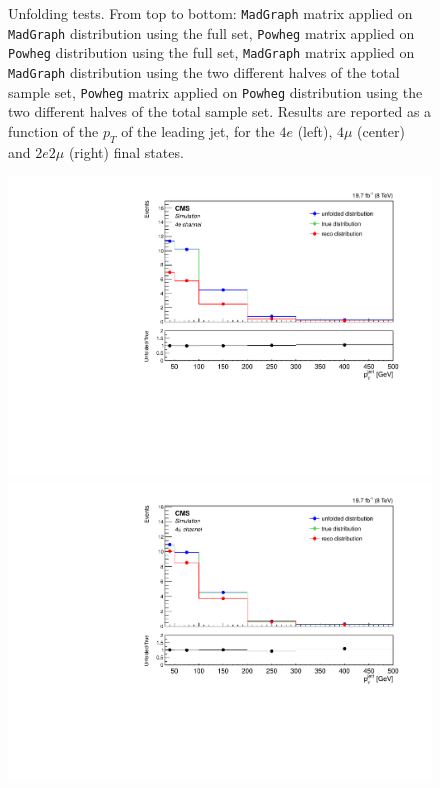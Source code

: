 \begin{figure}[hbtp]
\begin{center}
      \caption{Unfolding tests. From top to bottom: \texttt{MadGraph} matrix applied on \texttt{MadGraph} distribution using the full set, \texttt{Powheg} matrix applied on \texttt{Powheg} distribution using the full set,  \texttt{MadGraph} matrix applied on \texttt{MadGraph} distribution using the two different halves of the total sample set, \texttt{Powheg} matrix applied on \texttt{Powheg} distribution using the two different halves of the total sample set. Results are reported as a function of the $p_T$ of the leading jet, for the $4e$ (left), $4\mu$ (center) and $2e2\mu$ (right) final states.}
    \label{fig:MCtest_PtJet11}
  \end{center}
\end{figure}

\begin{figure}[hbtp]
  \begin{center}
    \includegraphics[width=0.8\cmsFigWidth]{Figures/Unfolding/MCTests/PtJet1_ZZTo4e_MadMatrix_PowDistr_FullSample_fr}     
    \includegraphics[width=0.8\cmsFigWidth]{Figures/Unfolding/MCTests/PtJet1_ZZTo4m_MadMatrix_PowDistr_FullSample_fr}     

\end{center}
\end{figure}
